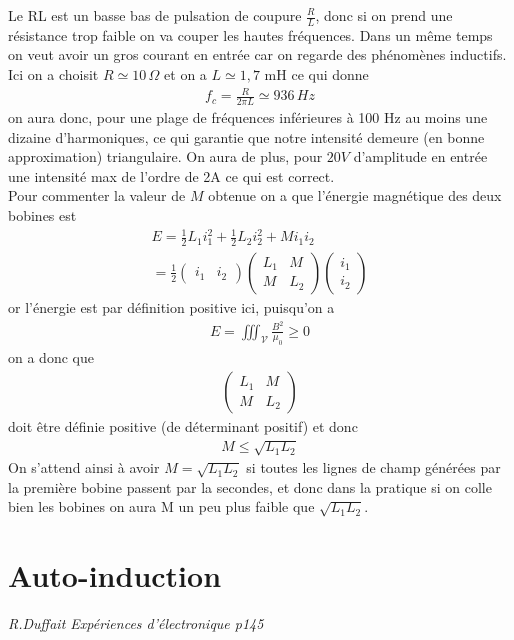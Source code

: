 \documentclass[12pt,prb,aps,epsf]{article}
\begin{document}
Le RL est un basse bas de pulsation de coupure $\frac{R}{L}$, donc si on prend une résistance trop faible on va couper les hautes fréquences. Dans un même temps on veut avoir un gros courant en entrée car on regarde des phénomènes inductifs. Ici on a choisit $R \simeq 10\, \Omega$ et on a $L \simeq 1,7$ mH ce qui donne 
\begin{eqnarray}
f_c = \frac{R}{2\pi L} \simeq 936 \,Hz
\end{eqnarray}
on aura donc, pour une plage de fréquences inférieures à 100 Hz au moins une dizaine d'harmoniques, ce qui garantie que notre intensité demeure (en bonne approximation) triangulaire. On aura de plus, pour $20V$ d'amplitude en entrée une intensité max de l'ordre de 2A ce qui est correct.\\
 
Pour commenter la valeur de $M$ obtenue on a que l'énergie magnétique des deux bobines est 
\begin{eqnarray}
E = \frac{1}{2}L_1i_1^2 + \frac{1}{2}L_2i_2^2 +Mi_1i_2\\
= \frac{1}{2}\begin{pmatrix}
i_1 & i_2
\end{pmatrix}
\begin{pmatrix}
L_1 & M\\
M & L_2
\end{pmatrix}
\begin{pmatrix}
i_1\\
i_2
\end{pmatrix}
\end{eqnarray}
or l'énergie est par définition positive ici, puisqu'on a 
\begin{eqnarray}
E= \iiint_{\mathcal{V}} \frac{B^2}{\mu_0} \geq 0
\end{eqnarray} 
on a donc que 
\begin{eqnarray}
\begin{pmatrix}
L_1 & M\\
M & L_2
\end{pmatrix}
\end{eqnarray}
doit être définie positive (de déterminant positif) et donc 
\begin{eqnarray}
M \leq \sqrt{L_1L_2}
\end{eqnarray}
On s'attend ainsi à avoir $M = \sqrt{L_1L_2}$ si toutes les lignes de champ générées par la première bobine passent par la secondes, et donc dans la pratique si on colle bien les bobines on aura M un peu plus faible que $\sqrt{L_1L_2}$. 

\section{Auto-induction}
\textit{R.Duffait Expériences d'électronique p145}
\end{document}
